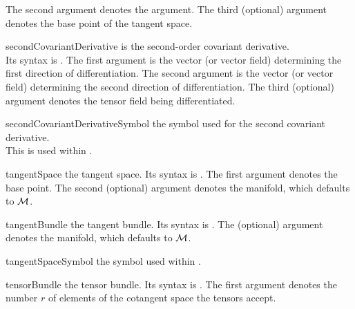 \documentclass[english,a4paper,DIV=12,parskip=full,oneside]{scrartcl}
\begin{document}
\begin{commandlist}
		The second argument denotes the argument.
		The third (optional) argument denotes the base point of the tangent space.
		\par{}
		\par{}
		\par{}
	\item[secondCovariantDerivative]\hspace*{3em}is the second-order covariant derivative.\\
		Its syntax is .
		The first argument is the vector (or vector field) determining the first direction of differentiation.
		The second argument is the vector (or vector field) determining the second direction of differentiation.
		The third (optional) argument denotes the tensor field being differentiated.
		\par{}
	\item[secondCovariantDerivativeSymbol]\hspace*{6em} the symbol used for the second covariant derivative.\\
        This is used within \codeCommand{\secondCovariantDerivative}.
		\par\mathCodeExample{\secondCovariantDerivativeSymbol}
	\item[tangentSpace] the tangent space.
		Its syntax is .
		The first argument denotes the base point.
		The second (optional) argument denotes the manifold, which defaults to $\mathcal{M}$.
		\par{}
		\par{}
	\item[tangentBundle] the tangent bundle.
		Its syntax is \codeCommand{\tangentBundle[#1]}.
		The (optional) argument denotes the manifold, which defaults to $\mathcal{M}$.
		\par\mathCodeExample{\tangentBundle}
		\par\mathCodeExample{\tangentBundle[\cN]}
	\item[tangentSpaceSymbol] the symbol used within \codeCommand{\tangent}.
		\par\mathCodeExample{\tangentSpaceSymbol}
	\item[tensorBundle] the tensor bundle.
		Its syntax is .
		The first argument denotes the number $r$ of elements of the cotangent space the tensors accept.

\end{commandlist}
\end{document}
